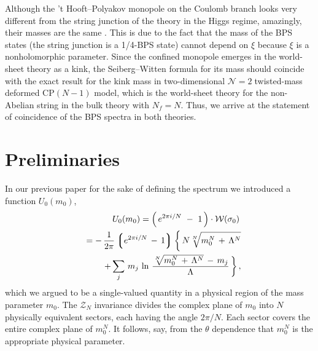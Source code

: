 \documentclass[epsfig,12pt]{article}
\def\beqn{\begin{eqnarray}}
\def\eeqn{\end{eqnarray}}
\newcommand{\ntwo}{${\mathcal N}=2\;$}
\def\beqn{\begin{eqnarray}}
\def\eeqn{\end{eqnarray}}
\newcommand{\mc}[1]{\mathcal{#1}}
\newcommand{\lgr}{\left\lgroup}
\newcommand{\rgr}{\right\rgroup}
\begin{document}
Although the 't Hooft--Polyakov monopole on the Coulomb branch
looks very different from the string junction of the theory in the Higgs regime,
amazingly, their masses are the same 
\cite{Shifman:2004dr,4}. This is due to the fact that
the mass of the BPS states (the string junction is a 1/4-BPS state) cannot depend on
$\xi$ because $\xi$ is a nonholomorphic parameter. Since the confined monopole
emerges in the world-sheet theory as a kink, the Seiberg--Witten
formula for its mass should coincide with the exact result for the kink
mass in two-dimensional \ntwo twisted-mass deformed  CP$(N-1)$ model, which is 
the world-sheet theory for the non-Abelian string in the bulk theory with $N_f=N$. 
 Thus, we arrive at
the statement of coincidence of the BPS spectra in both theories.







\section{Preliminaries}
\setcounter{equation}{0}
\label{prer}

	In our previous paper \cite{Bolokhov:2011mp} for the sake of defining the spectrum we introduced a function $ U_0(m_0) $,
\beqn
	&&
U_0 (m_0) = \left(\, e^{2 \pi i / N} ~-~ 1 \,\right) \cdot \mc{W}(\sigma_0)\,
\nonumber\\
	&&
= -\, \frac{1}{2\pi} \lgr e^{2\pi i / N} \,-\, 1 \rgr 
	\biggl\{\, N \sqrt[N] { m_0^N \,+\, \Lambda^N }  
\nonumber\\
&&
		+\sum_j\, m_j\, \ln \, \frac{ \sqrt[N] { m_0^N \,+\, \Lambda^N } \,-\, m_j } { \Lambda} \,\biggr\}\,,
\eeqn
	which we argued to be a single-valued quantity in a physical region of the mass parameter $ m_0 $.
	The $\mc{Z}_N$ invariance divides the complex plane of $ m_0 $ into $ N $ physically equivalent  sectors,
	each having the angle $2\pi/N$. Each sector covers the entire complex plane of
	$m_0^N$. 
	It follows, say, from the $\theta$ dependence that $m_0^N$ is the appropriate physical parameter.
	
\end{document}
